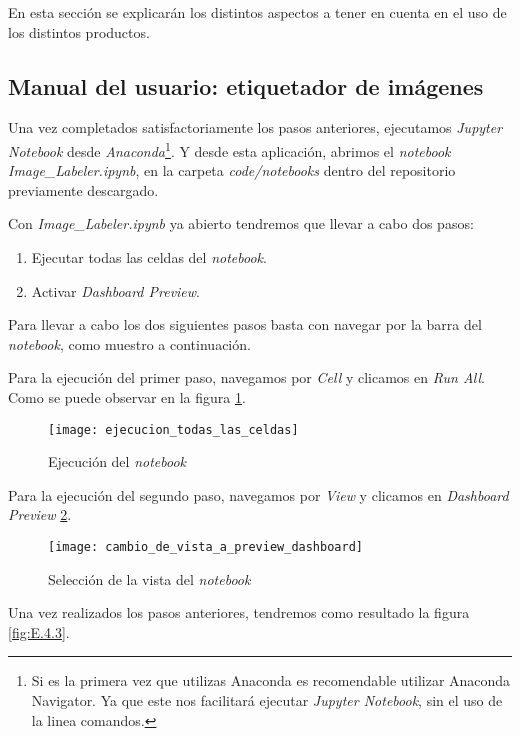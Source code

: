 En esta sección se explicarán los distintos aspectos a tener en cuenta en el uso de los distintos productos.

\subsection{Manual del usuario: etiquetador de imágenes}

Una vez completados satisfactoriamente los pasos anteriores,  ejecutamos \textit{Jupyter Notebook} desde \textit{Anaconda}\footnote{ Si es la primera vez que utilizas Anaconda es recomendable utilizar Anaconda Navigator. Ya que este nos facilitará ejecutar \textit{Jupyter Notebook}, sin el uso de la linea comandos.}. Y desde esta aplicación, abrimos el \textit{notebook} \textit{Image\_Labeler.ipynb}, en la carpeta \textit{code/notebooks} dentro del repositorio previamente descargado.

Con \textit{Image\_Labeler.ipynb} ya abierto tendremos que llevar a cabo dos pasos:

\begin{enumerate}[1.]
    \item Ejecutar todas las celdas del \textit{notebook}.
    \item Activar \textit{Dashboard Preview}.
\end{enumerate}

Para llevar a cabo los dos siguientes pasos basta con navegar por la barra del \textit{notebook}, como muestro a continuación. 

Para la ejecución del primer paso, navegamos por \textit{Cell} y clicamos en \textit{Run All}. Como se puede observar en la figura \ref{fig:E.4.1}.

\begin{figure}[h]
\centering
\texttt{[image: ejecucion\_todas\_las\_celdas]}
\caption{Ejecución del \textit{notebook}}
\label{fig:E.4.1}
\end{figure}

Para la ejecución del segundo paso, navegamos por \textit{View} y clicamos en \textit{Dashboard Preview} \ref{fig:E.4.2}.

\begin{figure}[h]
\centering
\texttt{[image: cambio\_de\_vista\_a\_preview\_dashboard]}
\caption{Selección de la vista del \textit{notebook}}
\label{fig:E.4.2}
\end{figure}

Una vez realizados los pasos anteriores, tendremos como resultado la figura \ref{fig:E.4.3}.

